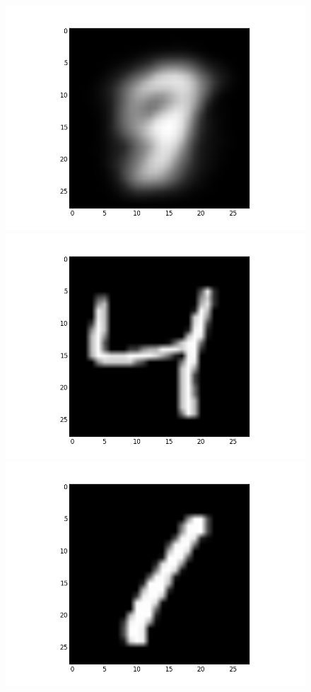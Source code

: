 \documentclass[submit]{harvardml}
\begin{document}
\begin{figure}[ht]
    \centering
    \includegraphics[scale=0.15]{K2-mean-1}
    \includegraphics[scale=0.15]{K2-representative-1-0}
    \includegraphics[scale=0.15]{K2-representative-1-1}

\end{figure}
\end{document}
